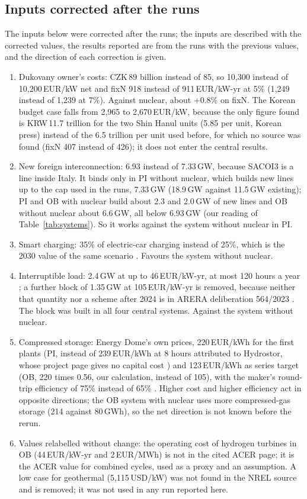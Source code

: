 \subsection{Inputs corrected after the runs}\label{sec:corrections}
The inputs below were corrected after the runs; the inputs are described with the corrected values, the results reported are from the runs with the previous values, and the direction of each correction is given.
\begin{enumerate}\setlength\itemsep{1pt}
\item Dukovany owner's costs: CZK\,89 billion instead of 85, so 10{,}300 instead of 10{,}200\,EUR/kW net and fixN 918 instead of 911\,EUR/kW-yr at 5\% (1{,}249 instead of 1{,}239 at 7\%). Against nuclear, about +0.8\% on fixN. The Korean budget case falls from 2{,}965 to 2{,}670\,EUR/kW, because the only figure found is KRW\,11.7 trillion for the two Shin Hanul units (5.85 per unit, Korean press) instead of the 6.5 trillion per unit used before, for which no source was found (fixN 407 instead of 426); it does not enter the central results.
\item New foreign interconnection: 6.93 instead of 7.33\,GW, because SACOI3 is a line inside Italy. It binds only in PI without nuclear, which builds new lines up to the cap used in the runs, 7.33\,GW (18.9\,GW against 11.5\,GW existing); PI and OB with nuclear build about 2.3 and 2.0\,GW of new lines and OB without nuclear about 6.6\,GW, all below 6.93\,GW (our reading of Table~\ref{tab:systems}). So it works against the system without nuclear in PI.
\item Smart charging: 35\% of electric-car charging instead of 25\%, which is the 2030 value of the same scenario \citep{TandE2024}. Favours the system without nuclear.
\item Interruptible load: 2.4\,GW at up to 46\,EUR/kW-yr, at most 120 hours a year \citep{ARERA12}; a further block of 1.35\,GW at 105\,EUR/kW-yr is removed, because neither that quantity nor a scheme after 2024 is in ARERA deliberation 564/2023 \citep{ARERA564}. The block was built in all four central systems. Against the system without nuclear.
\item Compressed storage: Energy Dome's own prices, 220\,EUR/kWh for the first plants (PI, instead of 239\,EUR/kWh at 8 hours attributed to Hydrostor, whose project page gives no capital cost \citep{HydrostorSC}) and 123\,EUR/kWh as series target (OB, 220 times 0.56, our calculation, instead of 105), with the maker's round-trip efficiency of 75\% instead of 65\% \citep{EnergyDome}. Higher cost and higher efficiency act in opposite directions; the OB system with nuclear uses more compressed-gas storage (214 against 80\,GWh), so the net direction is not known before the rerun.
\item Values relabelled without change: the operating cost of hydrogen turbines in OB (44\,EUR/kW-yr and 2\,EUR/MWh) is not in the cited ACER page; it is the ACER value for combined cycles, used as a proxy and an assumption. A low case for geothermal (5{,}115\,USD/kW) was not found in the NREL source and is removed; it was not used in any run reported here.
\end{enumerate}
